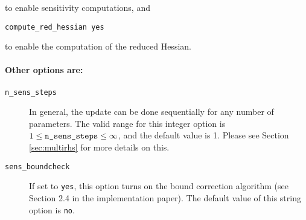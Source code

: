 \documentclass[letter, 11pt]{article}
\newcommand{\redhessopt}{compute\_red\_hessian}
\newcommand{\selectstep}{select\_step}
\newcommand{\nstepsopt}{n\_sens\_steps}
\newcommand{\boundcheckopt}{sens\_boundcheck}
\begin{document}
\noindent to enable sensitivity computations, and

\begin{description}
  \item \texttt{{\redhessopt} yes}
\end{description}

\noindent to enable the computation of the reduced Hessian.

\paragraph{Other options are:}

\begin{description}

%
%

\item[\texttt{\nstepsopt}] In general, the update can be done sequentially for any number of parameters.
				  The valid range for this integer option is $1 \leq \mbox{\texttt{\nstepsopt}} \leq \infty$,
                  and the default value is 1. Please see Section \ref{sec:multirhs} for more details on this.

\item[\texttt{\boundcheckopt}] If set to \texttt{yes}, this option turns on the bound correction algorithm (see Section 2.4 in the
           implementation paper). The default value of this string option is \texttt{no}.


\end{description}
\end{document}
